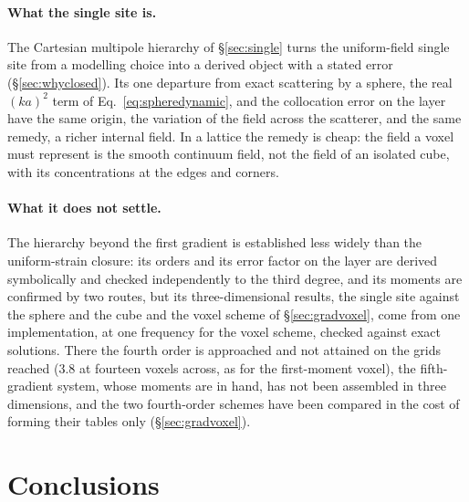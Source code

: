 \documentclass[11pt,a4paper]{article}
\begin{document}
\paragraph{What the single site is.} The Cartesian multipole hierarchy of \S\ref{sec:single} turns the
uniform-field single site from a modelling choice into a derived object with a stated error
(\S\ref{sec:whyclosed}). Its one departure from exact scattering by a sphere, the real $(ka)^2$ term of
Eq.~\eqref{eq:spheredynamic}, and the collocation error on the layer \citep{NestorError2026} have the same origin,
the variation of the field across the scatterer, and the same remedy, a richer internal field. In a lattice the
remedy is cheap: the field a voxel must represent is the smooth continuum field, not the field of an
isolated cube, with its concentrations at the edges and corners.


\paragraph{What it does not settle.} The hierarchy beyond the first gradient is established less widely
than the uniform-strain closure: its orders and its error factor on the layer are derived symbolically
and checked independently to the third degree, and its moments are confirmed by two routes, but its
three-dimensional results, the single site against the sphere and the cube and the voxel scheme of
\S\ref{sec:gradvoxel}, come from one implementation, at one frequency for the voxel scheme, checked
against exact solutions. There the fourth order is approached and not attained on the grids reached
($3.8$ at fourteen voxels across, as for the first-moment voxel), the fifth-gradient system, whose
moments are in hand, has not been assembled in three dimensions, and the two fourth-order schemes have
been compared in the cost of forming their tables only (\S\ref{sec:gradvoxel}).

\section{Conclusions}\label{sec:summary}
\end{document}
